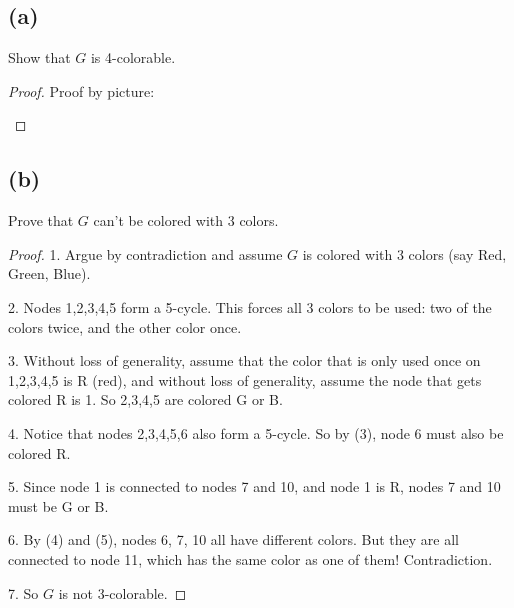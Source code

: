 \documentclass[14pt]{extarticle}
\begin{document}
\subsection{(a)}
Show that $G$ is 4-colorable.
\begin{proof}
Proof by picture:
\begin{center}
\end{center}
\end{proof}
\subsection{(b)}
Prove that $G$ can't be colored with 3 colors.
\begin{proof}
1. Argue by contradiction and assume $G$ is colored with 3 colors (say Red, Green, Blue).

2. Nodes 1,2,3,4,5 form a 5-cycle. This forces all 3 colors to be used: two of the colors twice, and the other color once. 

3. Without loss of generality, assume that the color that is only used once on 1,2,3,4,5 is R (red), and without loss of generality, assume the node that gets colored R is 1. So 2,3,4,5 are colored G or B.

4. Notice that nodes 2,3,4,5,6 also form a 5-cycle. So by (3), node 6 must also be colored R.

5. Since node 1 is connected to nodes 7 and 10, and node 1 is R, nodes 7 and 10 must be G or B.

6. By (4) and (5), nodes 6, 7, 10 all have different colors. But they are all connected to node 11, which has the same color as one of them! Contradiction.

7. So $G$ is not 3-colorable.
\end{proof}
\end{document}
